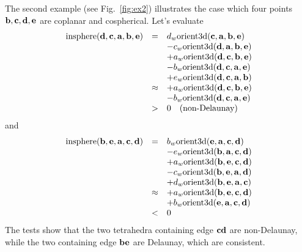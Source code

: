 The second example (see Fig.~\ref{fig:ex2}) illustrates the case which four points ${\bf b}, {\bf c}, {\bf d}, {\bf e}$ are coplanar and cospherical. Let's evaluate 
\[
\begin{array}{rcl}
\textrm{insphere}({\bf d},{\bf c},{\bf a},{\bf b},{\bf e}) &=&
d_w\textrm{orient3d}({\bf c},{\bf a},{\bf b},{\bf e})\\
& & -c_w\textrm{orient3d}({\bf d},{\bf a},{\bf b},{\bf e})\\
& & +a_w\textrm{orient3d}({\bf d},{\bf c},{\bf b},{\bf e})\\
& & -b_w\textrm{orient3d}({\bf d},{\bf c},{\bf a},{\bf e})\\
& & +e_w\textrm{orient3d}({\bf d},{\bf c},{\bf a},{\bf b})\\
&\approx& +a_w\textrm{orient3d}({\bf d},{\bf c},{\bf b},{\bf e})\\
& & -b_w\textrm{orient3d}({\bf d},{\bf c},{\bf a},{\bf e})\\
&>& 0  \quad \textrm{(non-Delaunay)}
\end{array}
\]
and
\[
\begin{array}{rcl}
\textrm{insphere}({\bf b},{\bf e},{\bf a},{\bf c},{\bf d}) &=&
b_w\textrm{orient3d}({\bf e},{\bf a},{\bf c},{\bf d})\\
& & -e_w\textrm{orient3d}({\bf b},{\bf a},{\bf c},{\bf d})\\
& & +a_w\textrm{orient3d}({\bf b},{\bf e},{\bf c},{\bf d})\\
& & -c_w\textrm{orient3d}({\bf b},{\bf e},{\bf a},{\bf d})\\
& & +d_w\textrm{orient3d}({\bf b},{\bf e},{\bf a},{\bf c})\\
&\approx& +a_w\textrm{orient3d}({\bf b},{\bf e},{\bf c},{\bf d})\\
& & +b_w\textrm{orient3d}({\bf e},{\bf a},{\bf c},{\bf d})\\
&<& 0
\end{array}
\]
The tests show that the two tetrahedra containing edge ${\bf cd}$ are non-Delaunay, while the two containing edge ${\bf be}$ are Delaunay, which are consistent.